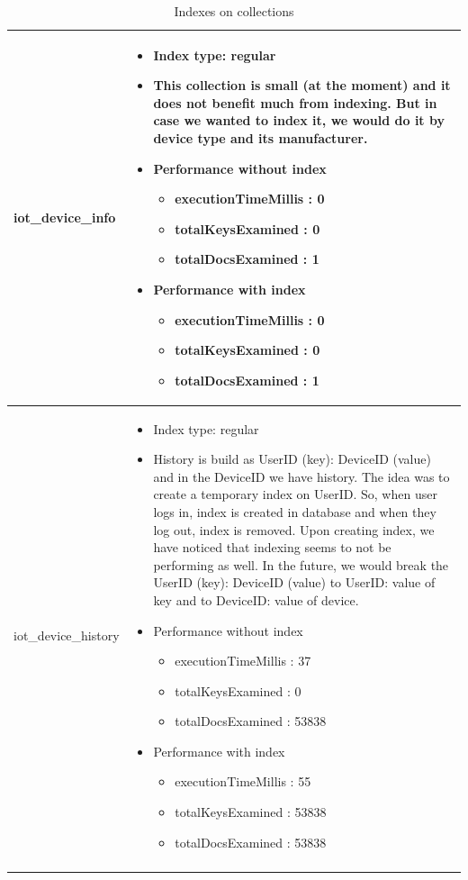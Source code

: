 \begin{center}
\begin{longtable}{ |m{4cm}|m{9cm}| }
  \hline
  iot{\_}device{\_}info &  
  \begin{itemize}
    \item Index type: regular
    \item This collection is small (at the moment) and it does not benefit much from indexing. But in case we wanted to index it, we would do it by device type and its manufacturer.
    \item Performance without index
    \begin{itemize}
        \item executionTimeMillis : 0
        \item totalKeysExamined : 0
        \item totalDocsExamined : 1
    \end{itemize}
    \item Performance with index
    \begin{itemize}
        \item executionTimeMillis : 0
        \item totalKeysExamined : 0
        \item totalDocsExamined : 1
    \end{itemize}
  \end{itemize} \\
  
  \hline
 iot{\_}device{\_}history &  
  \begin{itemize}
    \item Index type: regular
    \item History is build as UserID (key): DeviceID (value) and in the DeviceID we have history. The idea was to create a temporary index on UserID. So, when user logs in, index is created in database and when they log out, index is removed. Upon creating index, we have noticed that indexing seems to not be performing as well. In the future, we would break the UserID (key): DeviceID (value) to UserID: value of key and to DeviceID: value of device.
    \item Performance without index
    \begin{itemize}
        \item executionTimeMillis : 37
        \item totalKeysExamined : 0
        \item totalDocsExamined : 53838
    \end{itemize}
    \item Performance with index
    \begin{itemize}
        \item executionTimeMillis : 55
        \item totalKeysExamined : 53838
        \item totalDocsExamined : 53838
    \end{itemize}
  \end{itemize} \\
  \hline
\caption{Indexes on collections}
\end{longtable}
\end{center}

